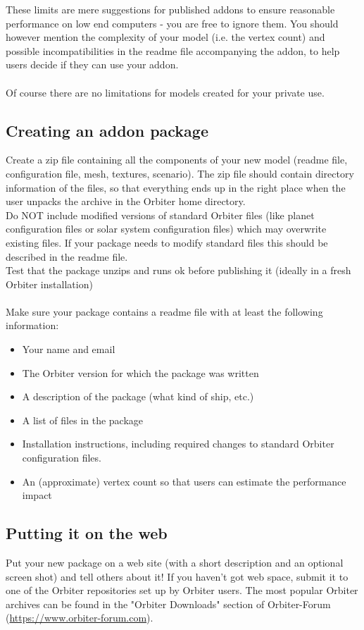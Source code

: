 \documentclass[Orbiter Developer Manual.tex]{subfiles}
\begin{document}
\noindent
These limits are mere suggestions for published addons to ensure reasonable performance on low end computers - you are free to ignore them. You should however mention the complexity of your model (i.e. the vertex count) and possible incompatibilities in the readme file accompanying the addon, to help users decide if they can use your addon.\\
\\
Of course there are no limitations for models created for your private use.


\subsection{Creating an addon package}
Create a zip file containing all the components of your new model (readme file, configuration file, mesh, textures, scenario). The zip file should contain directory information of the files, so that everything ends up in the right place when the user unpacks the archive in the Orbiter home directory.\\
Do NOT include modified versions of standard Orbiter files (like planet configuration files or solar system configuration files) which may overwrite existing files. If your package needs to modify standard files this should be described in the readme file.\\
Test that the package unzips and runs ok before publishing it (ideally in a fresh Orbiter installation)\\
\\
Make sure your package contains a readme file with at least the following information:

\begin{itemize}
\item Your name and email
\item The Orbiter version for which the package was written
\item A description of the package (what kind of ship, etc.)
\item A list of files in the package
\item Installation instructions, including required changes to standard Orbiter configuration files.
\item An (approximate) vertex count so that users can estimate the performance impact
\end{itemize}

\subsection{Putting it on the web}
Put your new package on a web site (with a short description and an optional screen shot) and tell others about it! If you haven't got web space, submit it to one of the Orbiter repositories set up by Orbiter users. The most popular Orbiter archives can be found in the "Orbiter Downloads" section of Orbiter-Forum (\url{https://www.orbiter-forum.com}).
\end{document}
